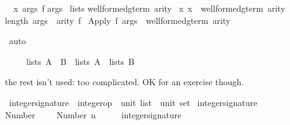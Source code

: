 \begin{isabellebody}
\begin{isamarkuptxt}
\begin{isabelle}
\ {}{\isachardot}\ {\isasymAnd}x\ args\ f{\isachardot}\isanewline
{}args\isanewline
{}\ lists\isanewline
{}well{\isacharunderscore}formed{\isacharunderscore}gterm{\isacharprime}\ arity\ {\isasyminter}\isanewline
{}x{\isachardot}\ x\ {\isasymin}\ well{\isacharunderscore}formed{\isacharunderscore}gterm\ arity{\isacharbraceright}{\isacharparenright}{\isacharsemicolon}\isanewline
{}length\ args\ {\isacharequal}\ arity\ f{\isasymrbrakk}\isanewline
{}\ Apply\ f\ args\ {\isasymin}\ well{\isacharunderscore}formed{\isacharunderscore}gterm\ arity%
\end{isabelle}%
\end{isamarkuptxt}%
\isamarkupfalse%
\ auto\isanewline
\isamarkupfalse%
%
\endisatagproof
{\isafoldproof}%
%
\isadelimproof
%
\endisadelimproof
\isamarkuptrue%
%
\begin{isamarkuptext}%
\begin{isabelle}%
\ \ \ \ \ lists\ {\isacharparenleft}A\ {\isasyminter}\ B{\isacharparenright}\ {\isacharequal}\ lists\ A\ {\isasyminter}\ lists\ B%
\end{isabelle}%
\end{isamarkuptext}%
\isamarkuptrue%
%
\begin{isamarkuptext}%
the rest isn't used: too complicated.  OK for an exercise though.%
\end{isamarkuptext}%
\isamarkupfalse%
\ integer{\isacharunderscore}signature\ {\isacharcolon}{\isacharcolon}\ {\isachardoublequote}{\isacharparenleft}integer{\isacharunderscore}op\ {\isacharasterisk}\ {\isacharparenleft}unit\ list\ {\isacharasterisk}\ unit{\isacharparenright}{\isacharparenright}\ set{\isachardoublequote}\isanewline
\isamarkupfalse%
\ {\isachardoublequote}integer{\isacharunderscore}signature{\isachardoublequote}\isanewline
{}\isanewline
Number{\isacharcolon}\ \ \ \ \ {\isachardoublequote}{\isacharparenleft}Number\ n{\isacharcomma}\ \ \ {\isacharparenleft}{\isacharbrackleft}{\isacharbrackright}{\isacharcomma}\ {\isacharparenleft}{\isacharparenright}{\isacharparenright}{\isacharparenright}\ {\isasymin}\ integer{\isacharunderscore}signature{\isachardoublequote}\isanewline

\end{isabellebody}
